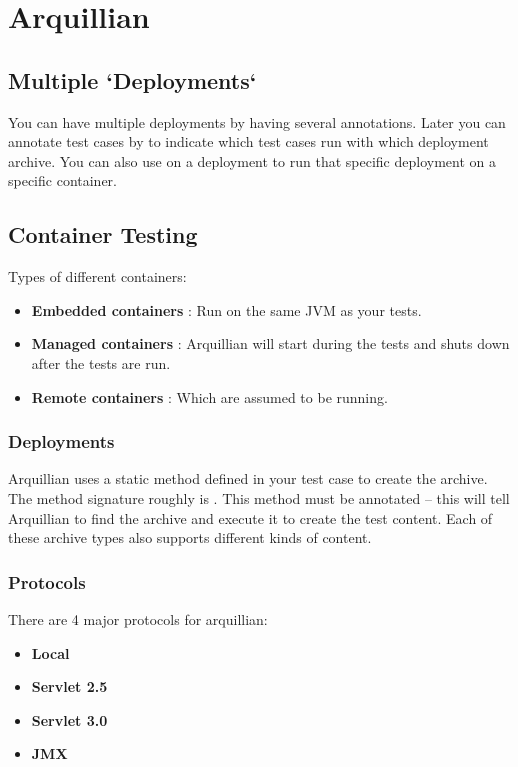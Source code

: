 \section{Arquillian}

\subsection{Multiple `Deployments`}
You can have multiple deployments by having several  annotations.
Later you can annotate test cases by  to indicate which test cases run with which deployment archive.
You can also use  on a deployment to run that specific deployment on a specific container.

\subsection{Container Testing}

Types of different containers:
\begin{itemize}
	\item \textbf{Embedded containers} : Run on the same JVM as your tests.
	\item \textbf{Managed containers} : Arquillian will start during the tests and shuts down after the tests are run.
	\item \textbf{Remote containers} : Which are assumed to be running.
\end{itemize}

\subsubsection{Deployments}
Arquillian uses a static method defined in your test case to create the archive. The
method signature roughly is .
This method must be annotated  – this will tell Arquillian to find
the archive and execute it to create the test content. Each of these archive types
also supports different kinds of content.
\subsubsection{Protocols}
There are 4 major protocols for arquillian:
\begin{itemize}
	\item \textbf{Local}
	\item \textbf{Servlet 2.5}
	\item \textbf{Servlet 3.0}
	\item \textbf{JMX}
\end{itemize}


